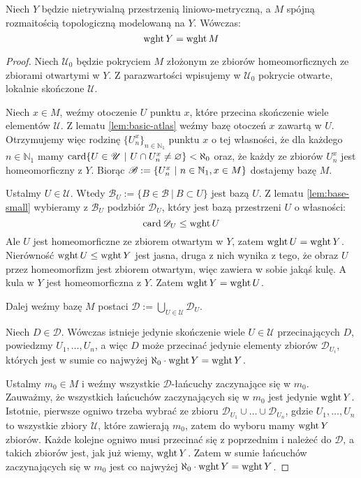 \begin{lem}
  Niech $Y$ będzie nietrywialną przestrzenią liniowo-metryczną, a $M$ spójną rozmaitością topologiczną modelowaną na $Y$. Wówczas:
  \[
    \operatorname{wght} Y = \operatorname{wght} M
  \]
  \begin{proof}
    Niech $\mathcal U_0$ będzie pokryciem $M$ złożonym ze zbiorów homeomorficznych ze zbiorami otwartymi w $Y$. Z parazwartości wpisujemy w $\mathcal U_0$ pokrycie otwarte, lokalnie skończone $\mathcal U$.
    
    Niech $x \in M$, weźmy otoczenie $U$ punktu $x$, które przecina skończenie wiele elementów $\mathcal U$. Z lematu \ref{lem:basic-atlas} weźmy bazę otoczeń $x$ zawartą w $U$. Otrzymujemy więc rodzinę $\{U_n^x\}_{n \in \mathbb{N}_1}$ punktu $x$ o tej własności, że dla każdego $n \in \mathbb{N}_1$ mamy $\operatorname{card}\{U \in \mathscr U\ |\ U \cap U_n^x \neq \varnothing\} < \aleph_0$ oraz, że każdy ze zbiorów $U_n^x$ jest homeomorficzny z $Y$. Biorąc $\mathscr B := \{U_n^x\ |\ n\in{\mathbb{N}_1}, x\in M\}$ dostajemy bazę $M$.
    
    Ustalmy $U \in \mathcal U$. Wtedy $\mathcal B_U := \{B \in \mathcal B\ |\ B \subset U\}$ jest bazą $U$. Z lematu \ref{lem:base-small} wybieramy z $\mathcal B_U$ podzbiór $\mathcal D_U$, który jest bazą przestrzeni $U$ o własności:
    \[
      \operatorname{card} \mathscr D_U \leq \operatorname{wght} U
    \]
    Ale $U$ jest homeomorficzne ze zbiorem otwartym w $Y$, zatem $\operatorname{wght} U = \operatorname{wght} Y$. Nierówność $\operatorname{wght} U \leq \operatorname{wght} Y$ jest jasna, druga z nich wynika z tego, że obraz $U$ przez homeomorfizm jest zbiorem otwartym, więc zawiera w sobie jakąś kulę. A kula w $Y$ jest homeomorficzna z $Y$. Zatem $\operatorname{wght} Y = \operatorname{wght} U$.
    
    Dalej weźmy bazę $M$ postaci $\mathcal D := \bigcup_{U \in \mathcal U} \mathcal D_U$.
    
    Niech $D \in \mathcal D$. Wówczas istnieje jedynie skończenie wiele $U \in \mathcal U$ przecinających $D$, powiedzmy $U_1, \ldots, U_n$, a więc $D$ może przecinać jedynie elementy zbiorów $\mathcal D_{U_i}$, których jest w sumie co najwyżej $\aleph_0 \cdot \operatorname{wght} Y = \operatorname{wght} Y$.
    
    Ustalmy $m_0 \in M$ i weźmy wszystkie $\mathcal D$-łańcuchy zaczynające się w $m_0$. Zauważmy, że wszystkich łańcuchów zaczynających się w $m_0$ jest jedynie $\operatorname{wght} Y$. Istotnie, pierwsze ogniwo trzeba wybrać ze zbioru $\mathcal D_{U_1} \cup \ldots \cup \mathcal D_{U_n}$, gdzie $U_1, \ldots, U_n$ to wszystkie zbiory $\mathcal U$, które zawierają $m_0$, zatem do wyboru mamy $\operatorname{wght} Y$ zbiorów. Każde kolejne ogniwo musi przecinać się z poprzednim i należeć do $\mathcal D$, a takich zbiorów jest, jak już wiemy, $\operatorname{wght} Y$. Zatem w sumie łańcuchów zaczynających się w $m_0$ jest co najwyżej $\aleph_0 \cdot \operatorname{wght} Y = \operatorname{wght} Y$.
    

\end{proof}
\end{lem}
